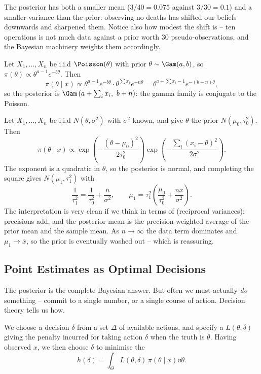 \begin{example}
  The posterior has both a smaller mean ($3/40 = 0.075$ against $3/30 = 0.1$) and a smaller variance than the prior: observing no deaths has shifted our beliefs downwards and sharpened them. Notice also how modest the shift is -- ten operations is not much data against a prior worth $30$ pseudo-observations, and the Bayesian machinery weights them accordingly.
\end{example}

\begin{example}
  Let $X_1, \dots, X_n$ be i.i.d $\Poisson(\theta)$ with prior $\theta \sim \Gam(a, b)$, so $\pi(\theta) \propto \theta^{a-1}e^{-b\theta}$. Then
  $$
  \pi(\theta\mid x) \propto \theta^{a-1}e^{-b\theta}\cdot \theta^{\sum x_i}e^{-n\theta} = \theta^{a + \sum x_i - 1}e^{-(b+n)\theta},
  $$
  so the posterior is $\Gam\left(a + \sum_i x_i,\ b + n\right)$: the gamma family is conjugate to the Poisson.
\end{example}

\begin{example}
  Let $X_1, \dots, X_n$ be i.i.d $N(\theta, \sigma^2)$ with $\sigma^2$ known, and give $\theta$ the prior $N(\mu_0, \tau_0^2)$. Then
  $$
  \pi(\theta\mid x) \propto \exp\left(-\frac{(\theta - \mu_0)^2}{2\tau_0^2}\right)\exp\left(-\frac{\sum_i(x_i - \theta)^2}{2\sigma^2}\right).
  $$
  The exponent is a quadratic in $\theta$, so the posterior is normal, and completing the square gives $N(\mu_1, \tau_1^2)$ with
  $$
  \frac{1}{\tau_1^2} = \frac{1}{\tau_0^2} + \frac{n}{\sigma^2}, \qquad \mu_1 = \tau_1^2\left(\frac{\mu_0}{\tau_0^2} + \frac{n\overline{x}}{\sigma^2}\right).
  $$
  The interpretation is very clean if we think in terms of  (reciprocal variances): precisions add, and the posterior mean is the precision-weighted average of the prior mean and the sample mean. As $n \to \infty$ the data term dominates and $\mu_1 \to \overline{x}$, so the prior is eventually washed out -- which is reassuring.
\end{example}

\subsection{Point Estimates as Optimal Decisions}

The posterior is the complete Bayesian answer. But often we must actually \emph{do} something -- commit to a single number, or a single course of action. Decision theory tells us how.

We choose a decision $\delta$ from a set $\Delta$ of available actions, and specify a  $L(\theta,\delta)$ giving the penalty incurred for taking action $\delta$ when the truth is $\theta$. Having observed $x$, we then choose $\delta$ to minimise the 
$$
h(\delta) = \int_\Theta L(\theta,\delta)\,\pi(\theta\mid x)\dd\theta.
$$

